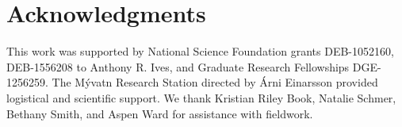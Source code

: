 \documentclass[12pt]{article}
\begin{document}



















\section*{Acknowledgments}

This work was supported by National Science Foundation grants 
DEB-1052160, DEB-1556208 to Anthony R. Ives,
and Graduate Research Fellowships DGE-1256259.
The M\'{y}vatn Research Station directed by \'{A}rni Einarsson
provided logistical and scientific support.
We thank Kristian Riley Book, Natalie Schmer, Bethany Smith, and Aspen Ward
for assistance with fieldwork.


\end{document}
